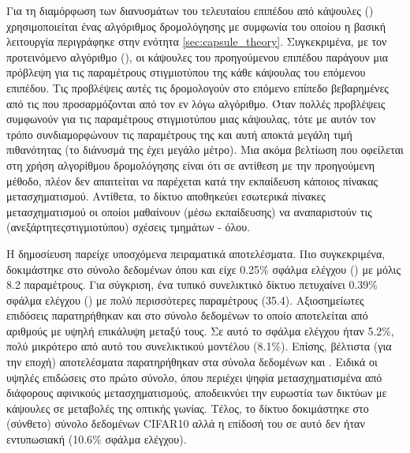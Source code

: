 Για τη διαμόρφωση των διανυσμάτων του τελευταίου επιπέδου από κάψουλες () χρησιμοποιείται ένας αλγόριθμος δρομολόγησης με συμφωνία του οποίου η βασική λειτουργία περιγράφηκε στην ενότητα \ref{sec:capsule_theory}. Συγκεκριμένα, με τον προτεινόμενο αλγόριθμο  (), οι κάψουλες του προηγούμενου επιπέδου παράγουν μια πρόβλεψη για τις παραμέτρους στιγμιοτύπου της κάθε κάψουλας του επόμενου επιπέδου. Τις προβλέψεις αυτές τις δρομολογούν στο επόμενο επίπεδο βεβαρημένες από τις  που προσαρμόζονται από τον εν λόγω αλγόριθμο. Όταν πολλές προβλέψεις συμφωνούν για τις παραμέτρους στιγμιοτύπου μιας κάψουλας, τότε με αυτόν τον τρόπο συνδιαμορφώνουν τις παραμέτρους της και αυτή αποκτά μεγάλη τιμή πιθανότητας (το διάνυσμά της έχει μεγάλο μέτρο). Μια ακόμα βελτίωση που οφείλεται στη χρήση αλγορίθμου δρομολόγησης είναι ότι σε αντίθεση με την προηγούμενη μέθοδο, πλέον δεν απαιτείται να παρέχεται κατά την εκπαίδευση κάποιος πίνακας μετασχηματισμού. Αντίθετα, το δίκτυο αποθηκεύει εσωτερικά πίνακες μετασχηματισμού οι οποίοι μαθαίνουν (μέσω εκπαίδευσης) να αναπαριστούν τις (ανεξάρτητες\textendash στιγμιοτύπου) σχέσεις τμημάτων - όλου.\par

Η δημοσίευση  παρείχε υποσχόμενα πειραματικά αποτελέσματα. Πιο συγκεκριμένα, δοκιμάστηκε στο σύνολο δεδομένων \cite{lecun1998gradientMNIST} όπου και είχε 0.25\% σφάλμα ελέγχου () με μόλις 8.2 παραμέτρους. Για σύγκριση, ένα τυπικό  συνελικτικό δίκτυο πετυχαίνει 0.39\% σφάλμα ελέγχου () με πολύ περισσότερες παραμέτρους (35.4). Αξιοσημείωτες επιδόσεις παρατηρήθηκαν και στο \cite{sabour2017dynamic} σύνολο δεδομένων το οποίο αποτελείται από αριθμούς με υψηλή επικάλυψη μεταξύ τους. Σε αυτό το σφάλμα ελέγχου ήταν 5.2\%, πολύ μικρότερο από αυτό του συνελικτικού μοντέλου (8.1\%). Επίσης, βέλτιστα (για την εποχή) αποτελέσματα παρατηρήθηκαν στα σύνολα δεδομένων  και . Ειδικά οι υψηλές επιδώσεις στο πρώτο σύνολο, όπου περιέχει ψηφία μετασχηματισμένα από διάφορους αφινικούς μετασχηματισμούς, αποδεικνύει την ευρωστία των δικτύων με κάψουλες σε μεταβολές της οπτικής γωνίας. Τέλος, το δίκτυο δοκιμάστηκε στο (σύνθετο) σύνολο δεδομένων CIFAR10 αλλά η επίδοσή του σε αυτό δεν ήταν εντυπωσιακή (10.6\% σφάλμα ελέγχου).

\subsubsection{}

